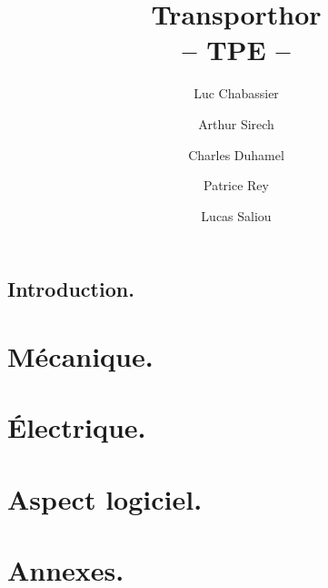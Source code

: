 \documentclass{report}
\title{Transporthor\\-- TPE --}
\author{Luc Chabassier \and Arthur Sirech \and Charles Duhamel \and Patrice Rey \and Lucas Saliou}
\begin{document}
\maketitle
\tableofcontents

\chapter{Introduction.}


\part{Mécanique.}


\part{Électrique.}


\part{Aspect logiciel.}


\part{Annexes.}
\appendix


\newpage
\listoffigures
{}
\end{document}
